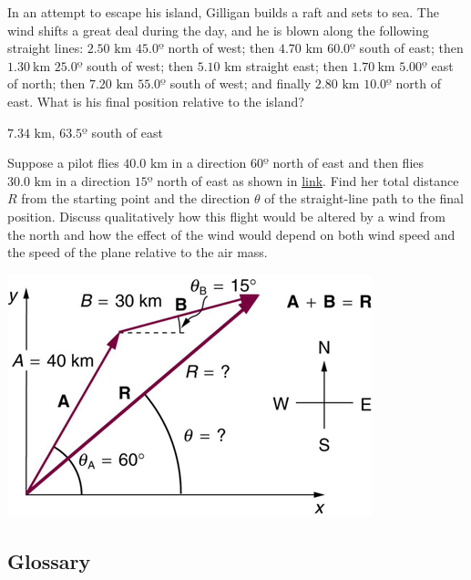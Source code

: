 \documentclass[
]{book}
\newenvironment{problems-exercises}{}{}
\begin{document}
\begin{problems-exercises}
\hypertarget{fs-id1849688}{}
\leavevmode\hypertarget{fs-id1849689}{}%
In an attempt to escape his island, Gilligan builds a raft and sets to
sea. The wind shifts a great deal during the day, and he is blown along
the following straight lines: \({2\text{.}\text{50\ km}}{}\) \(45.0º{}\)
north of west; then \({4\text{.}\text{70\ km}}{}\) \(60.0º{}\) south of
east; then \({1.30\ \text{km}}{}\) \(25.0º{}\) south of west; then
\({5\text{.}\text{10\ km}}{}\) straight east; then \({1.70\ \text{km}}{}\)
\(5.00º\) east of north; then \({7\text{.}\text{20\ km}}{}\) \(55.0º\) south
of west; and finally \({2\text{.}\text{80\ km}}{}\) \(10.0º\) north of east.
What is his final position relative to the island?

\leavevmode\hypertarget{fs-id1930787}{}%
\({7\text{.}\text{34\ km}}{}\), \({\text{63}\text{.}5º}{}\) south of east

\hypertarget{fs-id1955218}{}
\leavevmode\hypertarget{fs-id1955219}{}%
Suppose a pilot flies \({\text{40}\text{.}\text{0\ km}}{}\) in a direction
\(\text{60º}{}\) north of east and then flies
\({\text{30}\text{.}\text{0\ km}}{}\) in a direction \(\text{15º}{}\) north
of east as shown in
\protect\hyperlink{import-auto-id1165298708571}{link}. Find her
total distance \(R{}\) from the starting point and the direction
\(\theta{}\) of the straight-line path to the final position. Discuss
qualitatively how this flight would be altered by a wind from the north
and how the effect of the wind would depend on both wind speed and the
speed of the plane relative to the air mass.

\includegraphics{images/Figure_03_03_13a.jpg}

\end{problems-exercises}

\hypertarget{glossary-8}{%
\subsection{Glossary}\label{glossary-8}}
\end{document}
